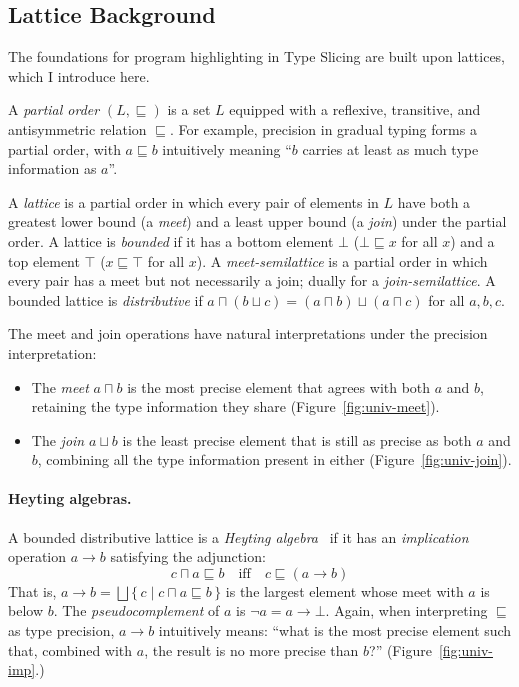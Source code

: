\subsection{Lattice Background}
\label{sec:lattice-background}

The foundations for program highlighting in Type Slicing are built upon lattices, which I introduce here.

A \textit{partial order} $(L, \sqsubseteq)$ is a set $L$ equipped with a reflexive, transitive, and antisymmetric relation $\sqsubseteq$. For example, precision in gradual typing forms a partial order, with $a \sqsubseteq b$ intuitively meaning ``$b$ carries at least as much type information as $a$''.

A \textit{lattice} is a partial order in which every pair of elements in $L$ have both a greatest lower bound (a \textit{meet}) and a least upper bound (a \textit{join}) under the partial order. A lattice is \textit{bounded} if it has a bottom element $\bot$ ($\bot \sqsubseteq x$ for all $x$) and a top element $\top$ ($x \sqsubseteq \top$ for all $x$). A \textit{meet-semilattice} is a partial order in which every pair has a meet but not necessarily a join; dually for a \textit{join-semilattice}. A bounded lattice is \textit{distributive} if $a \sqcap (b \sqcup c) = (a \sqcap b) \sqcup (a \sqcap c)$ for all $a, b, c$.

The meet and join operations have natural interpretations under the precision interpretation:
\begin{itemize}
\item The \textit{meet} $a \sqcap b$ is the most precise element that agrees with both $a$ and $b$, retaining the type information they share (Figure~\ref{fig:univ-meet}).
\item The \textit{join} $a \sqcup b$ is the least precise element that is still as precise as both $a$ and $b$, combining all the type information present in either (Figure~\ref{fig:univ-join}).
\end{itemize}

\paragraph{Heyting algebras.} A bounded distributive lattice is a \textit{Heyting algebra}~\cite{Heyting1930, DaveyPriestley} if it has an \textit{implication} operation $a \to b$ satisfying the adjunction:
\[c \sqcap a \sqsubseteq b \quad\text{iff}\quad c \sqsubseteq (a \to b)\]
That is, $a \to b = \bigsqcup\{\,c \mid c \sqcap a \sqsubseteq b\,\}$ is the largest element whose meet with $a$ is below $b$. The \textit{pseudocomplement} of $a$ is $\neg a = a \to \bot$. Again, when interpreting $\sqsubseteq$ as type precision, $a \to b$ intuitively means: ``what is the most precise element such that, combined with $a$, the result is no more precise than $b$?'' (Figure~\ref{fig:univ-imp}.)

